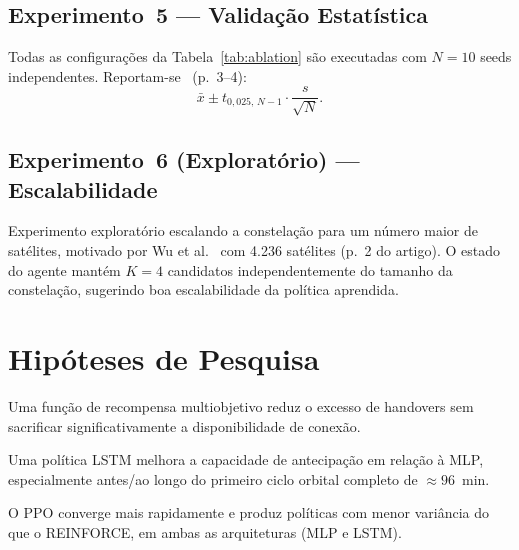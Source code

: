 \documentclass[12pt,a4paper]{article}
\begin{document}
\subsection{Experimento~5 --- Validação Estatística}

Todas as configurações da Tabela~\ref{tab:ablation} são executadas com $N=10$
seeds independentes. Reportam-se~\cite{henderson2018} (p.~3--4):
\begin{equation}
  \bar{x} \pm t_{0{,}025,\, N-1} \cdot \frac{s}{\sqrt{N}}.
\end{equation}

\subsection{Experimento~6 (Exploratório) --- Escalabilidade}

Experimento exploratório escalando a constelação para um número maior de
satélites, motivado por Wu et al.~\cite{wu2025} com 4.236 satélites (p.~2
do artigo). O estado do agente mantém $K=4$ candidatos independentemente do
tamanho da constelação, sugerindo boa escalabilidade da política aprendida.

\section{Hipóteses de Pesquisa}

\begin{description}[leftmargin=2.2cm, style=sameline]
  \item[\textbf{H1 --- Reward Shaping:}]
        Uma função de recompensa multiobjetivo reduz o excesso de handovers sem
        sacrificar significativamente a disponibilidade de conexão.

  \item[\textbf{H2 --- Temporalidade:}]
        Uma política LSTM melhora a capacidade de antecipação em relação à MLP,
        especialmente antes/ao longo do primeiro ciclo orbital completo de
        $\approx 96$~min.

  \item[\textbf{H3 --- Eficiência Algorítmica:}]
        O PPO converge mais rapidamente e produz políticas com menor variância
        do que o REINFORCE, em ambas as arquiteturas (MLP e LSTM).
\end{description}

\end{document}
